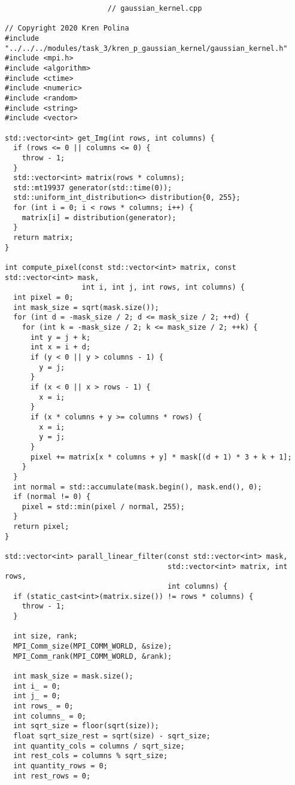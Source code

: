 \documentclass{report}
\begin{document}
\begin{lstlisting}
						// gaussian_kernel.cpp

// Copyright 2020 Kren Polina
#include "../../../modules/task_3/kren_p_gaussian_kernel/gaussian_kernel.h"
#include <mpi.h>
#include <algorithm>
#include <ctime>
#include <numeric>
#include <random>
#include <string>
#include <vector>

std::vector<int> get_Img(int rows, int columns) {
  if (rows <= 0 || columns <= 0) {
    throw - 1;
  }
  std::vector<int> matrix(rows * columns);
  std::mt19937 generator(std::time(0));
  std::uniform_int_distribution<> distribution{0, 255};
  for (int i = 0; i < rows * columns; i++) {
    matrix[i] = distribution(generator);
  }
  return matrix;
}

int compute_pixel(const std::vector<int> matrix, const std::vector<int> mask,
                  int i, int j, int rows, int columns) {
  int pixel = 0;
  int mask_size = sqrt(mask.size());
  for (int d = -mask_size / 2; d <= mask_size / 2; ++d) {
    for (int k = -mask_size / 2; k <= mask_size / 2; ++k) {
      int y = j + k;
      int x = i + d;
      if (y < 0 || y > columns - 1) {
        y = j;
      }
      if (x < 0 || x > rows - 1) {
        x = i;
      }
      if (x * columns + y >= columns * rows) {
        x = i;
        y = j;
      }
      pixel += matrix[x * columns + y] * mask[(d + 1) * 3 + k + 1];
    }
  }
  int normal = std::accumulate(mask.begin(), mask.end(), 0);
  if (normal != 0) {
    pixel = std::min(pixel / normal, 255);
  }
  return pixel;
}

std::vector<int> parall_linear_filter(const std::vector<int> mask,
                                      std::vector<int> matrix, int rows,
                                      int columns) {
  if (static_cast<int>(matrix.size()) != rows * columns) {
    throw - 1;
  }

  int size, rank;
  MPI_Comm_size(MPI_COMM_WORLD, &size);
  MPI_Comm_rank(MPI_COMM_WORLD, &rank);

  int mask_size = mask.size();
  int i_ = 0;
  int j_ = 0;
  int rows_ = 0;
  int columns_ = 0;
  int sqrt_size = floor(sqrt(size));
  float sqrt_size_rest = sqrt(size) - sqrt_size;
  int quantity_cols = columns / sqrt_size;
  int rest_cols = columns % sqrt_size;
  int quantity_rows = 0;
  int rest_rows = 0;


\end{lstlisting}
\end{document}
